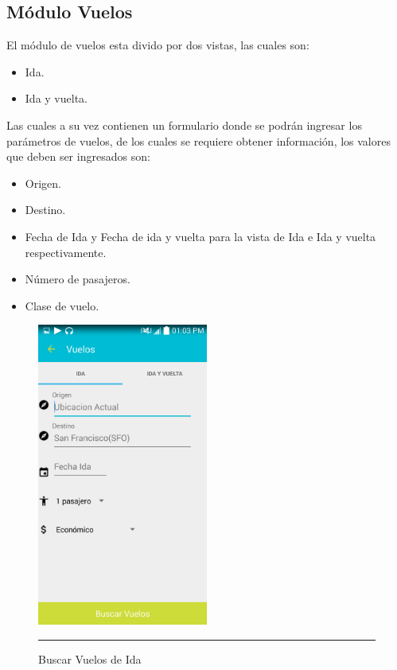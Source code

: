 \subsection{Módulo Vuelos}
El módulo de vuelos esta divido por dos vistas, las cuales son:

\begin{itemize}
\item Ida.
\item Ida y vuelta.
\end{itemize}

Las cuales a su vez contienen un formulario donde se podrán ingresar los parámetros de vuelos, 
de los cuales se requiere obtener información, los valores que deben ser ingresados son:

\begin{itemize}
\item Origen.
\item Destino.
\item Fecha de Ida y Fecha de ida y vuelta para la vista de Ida e Ida y vuelta respectivamente.
\item Número de pasajeros.
\item Clase de vuelo.
\end{itemize}

\begin{figure}[h]
	\centering
		\includegraphics[width=0.5\textwidth]{Figuras/idavuelos.png}
		\rule{30em}{0.5pt}
	\caption[Buscar Vuelos de Ida]{Buscar Vuelos de Ida}
	\label{fig:vuelosIda}
\end{figure}

